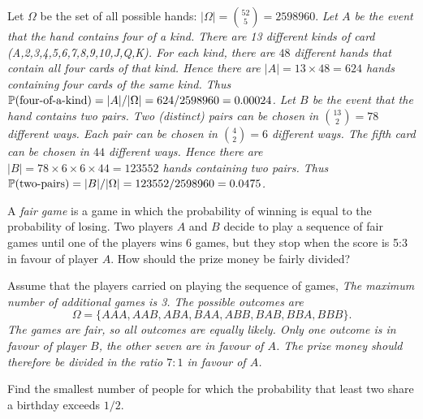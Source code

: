 \begin{solution}
Let $\Omega$ be the set of all possible hands: $|\Omega| = \binom{52}{5} = 2598960$.
\ben
\it Let $A$ be the event that the hand contains four of a kind.
	\bit
	\it There are 13 different kinds of card (A,2,3,4,5,6,7,8,9,10,J,Q,K).
	\it For each kind, there are $48$ different hands that contain all four cards of that kind.
	\it Hence there are $|A| = 13\times 48 = 624$ hands containing four cards of the same kind.
	\it Thus $\mathbb{P}(\text{four-of-a-kind}) = |A|/|\Omega| = 624/2598960 = 0.00024$.
	\eit
\it Let $B$ be the event that the hand contains two pairs.
	\bit
	\it Two (distinct) pairs can be chosen in $\binom{13}{2} = 78$ different ways.
	\it Each pair can be chosen in $\binom{4}{2} = 6$ different ways. 
	\it The fifth card can be chosen in $44$ different ways.
	\it Hence there are $|B| = 78\times 6\times 6\times 44 = 123552$ hands containing two pairs.
	\it Thus $\mathbb{P}(\text{two-pairs}) = |B|/|\Omega| = 123552/2598960 = 0.0475$.
	\eit
\een	
\end{solution}

\begin{example}
A \emph{fair game} is a game in which the probability of winning is equal to the probability of losing. Two players $A$ and $B$ decide to play a sequence of fair games until one of the players wins 6 games, but they stop when the score is 5:3 in favour of player $A$. How should the prize money be fairly divided?
\end{example}

\begin{solution}
Assume that the players carried on playing the sequence of games,
\bit
\it The maximum number of additional games is 3.
\it The possible outcomes are 
\[
\Omega=\{AAA,AAB,ABA,BAA,ABB,BAB,BBA,BBB\}.
\]
\eit
The games are fair, so all outcomes are equally likely.
\bit
\it Only one outcome is in favour of player $B$, the other seven are in favour of $A$.
\it The prize money should therefore be divided in the ratio $7:1$ in favour of $A$.
\eit
\end{solution}

\begin{example}
Find the smallest number of people for which the probability that least two share a birthday exceeds $1/2$.
\end{example}


